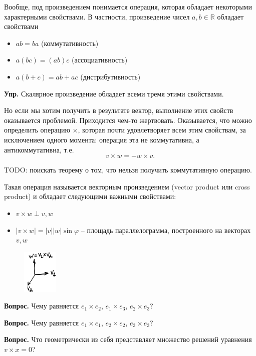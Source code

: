 \documentclass[a4paper,12pt]{article}
\newcommand{\ph}{\varphi}
\newcommand{\R}{\mathbb{R}}
\newcounter{z-counter}
\newcounter{th-counter}
\begin{document}
Вообще, под произведением понимается операция, которая обладает некоторыми характерными свойствами. В частности, произведение чисел $a,b \in \R$ обладает свойствами
\begin{itemize}
    \item $ab = ba$ (коммутативность)
    \item $a(bc) = (ab)c$ (ассоциативность)
    \item $a(b+c) = ab + ac$ (дистрибутивность)
\end{itemize}
\noindent\textbf{Упр.} Скалярное произведение обладает всеми тремя этими свойствами.

Но если мы хотим получить в результате вектор, выполнение этих свойств оказывается проблемой. Приходится чем-то жертвовать. Оказывается, что можно определить операцию $\times$, которая почти удовлетворяет всем этим свойствам, за исключением одного момента: операция эта не коммутативна, а антикоммутативна, т.е.
\[
v \times w = -w \times v.
\]

TODO: поискать теорему о том, что нельзя получить коммутативную операцию.

Такая операция называется векторным произведением (vector product или cross product) и обладает следующими важными свойствами:
\begin{itemize}
    \item $v \times w \perp v, w$
    \item $|v \times w| = |v||w|\sin \ph$ -- площадь параллелограмма, построенного на векторах $v,w$ 
\end{itemize}

\begin{figure}[H] %
    \centering
    \includegraphics[width=0.15\textwidth]{pictures/pct_cross_product.jpg}
\end{figure}

\noindent\textbf{Вопрос.} Чему равняется $e_1 \times e_2$, $e_1 \times e_3$, $e_2 \times e_3$?

\noindent\textbf{Вопрос.} Чему равняется $e_1 \times e_1$, $e_2 \times e_2$, $e_3 \times e_3$?

\noindent\textbf{Вопрос.} Что геометрически из себя представляет множество решений уравнения $v \times x = 0$?
\end{document}

